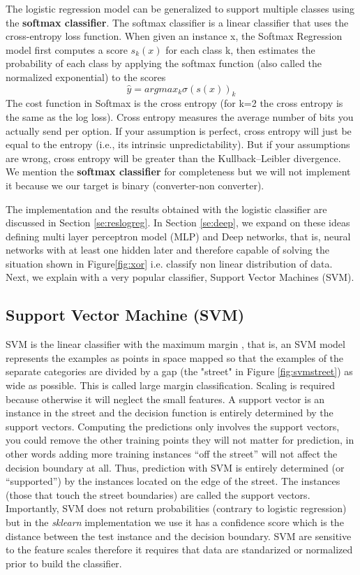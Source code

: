 \documentclass[11pt]{article}
\theoremstyle{definition}
\theoremstyle{remark}
\begin{document}
The logistic regression model can be generalized to support multiple classes using the \textbf{softmax classifier}. The softmax classifier is a linear classifier that uses the cross-entropy loss function. When given an instance x, the Softmax Regression model first computes a score $s_{k}(x)$ for each class k, then estimates the probability of each class by applying the softmax function (also called the normalized exponential) to the scores
\begin{equation}
\hat{y}= argmax_{k} \sigma(s(x))_k
\label{eq:softmax}
\end{equation}
The cost function in Softmax is the cross entropy (for k=2 the cross entropy is the same as the log loss). Cross entropy measures the average number of bits you actually send per option. If your assumption is perfect, cross entropy will just be equal to the entropy (i.e., its intrinsic unpredictability). But if your assumptions are wrong, cross entropy will be greater than the Kullback–Leibler divergence. We mention the \textbf{softmax classifier} for completeness but we will not implement it because we our target is binary (converter-non converter).

The implementation and the results obtained with the logistic classifier are discussed in Section \ref{se:reslogreg}. In Section \ref{se:deep}, we expand on these ideas defining multi layer perceptron model (MLP) and Deep networks, that is, neural networks with at least one hidden later and therefore capable of solving the situation shown in Figure\ref{fig:xor} i.e. classify non linear distribution of data.
Next, we explain with a very popular classifier, Support Vector Machines (SVM).

\subsection{Support Vector Machine (SVM)}
\label{sse:svm}
SVM is the linear classifier with the maximum margin \cite{vapnik2013nature}, that is, an SVM model represents the examples as points in space mapped so that the examples of the separate categories are divided by a gap (the "street" in Figure \ref{fig:svmstreet}) as wide as possible. This is called large margin classification. Scaling is required because otherwise it will neglect the small features.
A support vector is an instance in the street and the decision function is entirely determined by the support vectors. Computing the predictions only involves the support vectors, you could remove the other training points they will not matter for prediction, in other words adding more training instances “off the street” will not affect the decision boundary at all. Thus, prediction with SVM is entirely determined (or “supported”) by the instances located on the edge of the street. The instances (those that touch the street boundaries) are called the support vectors. Importantly, SVM does not return probabilities (contrary to logistic regression) but in the \emph{sklearn} implementation we use it has a confidence score which is the distance between the test instance and the decision boundary. SVM are sensitive to the feature scales therefore it requires that data are standarized or normalized prior to build the classifier. 
\end{document}

